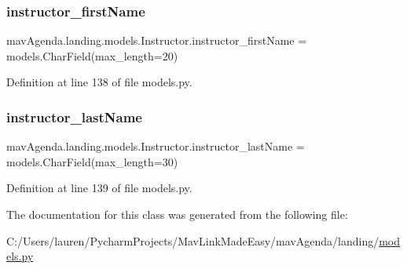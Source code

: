 \subsubsection{\texorpdfstring{instructor\+\_\+first\+Name}{instructor\_firstName}}
{\footnotesize\ttfamily mav\+Agenda.\+landing.\+models.\+Instructor.\+instructor\+\_\+first\+Name = models.\+Char\+Field(max\+\_\+length=20)\hspace{0.3cm}{\ttfamily [static]}}



Definition at line 138 of file models.\+py.

\mbox{\label{classmavAgenda_1_1landing_1_1models_1_1Instructor_ae220496393374d12b87a2041e43cea02}} 
\subsubsection{\texorpdfstring{instructor\+\_\+last\+Name}{instructor\_lastName}}
{\footnotesize\ttfamily mav\+Agenda.\+landing.\+models.\+Instructor.\+instructor\+\_\+last\+Name = models.\+Char\+Field(max\+\_\+length=30)\hspace{0.3cm}{\ttfamily [static]}}



Definition at line 139 of file models.\+py.



The documentation for this class was generated from the following file\+:\begin{DoxyCompactItemize}
\item 
C\+:/\+Users/lauren/\+Pycharm\+Projects/\+Mav\+Link\+Made\+Easy/mav\+Agenda/landing/\mbox{\hyperlink{models_8py}{models.\+py}}\end{DoxyCompactItemize}
